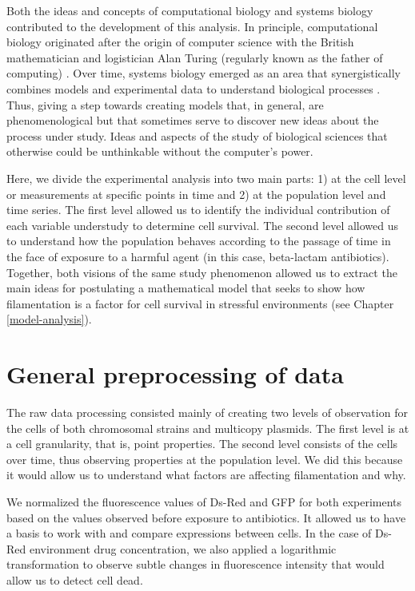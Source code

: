 \documentclass[
  12pt,
  a4paper,
  oneside]{krantz}
\begin{document}
Both the ideas and concepts of computational biology and systems biology
contributed to the development of this analysis. In principle,
computational biology originated after the origin of computer science
with the British mathematician and logistician Alan Turing (regularly
known as the father of computing) \citep{turing1950}. Over time, systems
biology emerged as an area that synergistically combines models and
experimental data to understand biological processes \citep{bruggeman}. Thus,
giving a step towards creating models that, in general, are
phenomenological but that sometimes serve to discover new ideas about
the process under study. Ideas and aspects of the study of biological
sciences that otherwise could be unthinkable without the computer's
power.

Here, we divide the experimental analysis into two main parts: 1) at the
cell level or measurements at specific points in time and 2) at the
population level and time series. The first level allowed us to identify
the individual contribution of each variable understudy to determine
cell survival. The second level allowed us to understand how the
population behaves according to the passage of time in the face of
exposure to a harmful agent (in this case, beta-lactam antibiotics).
Together, both visions of the same study phenomenon allowed us to
extract the main ideas for postulating a mathematical model that seeks
to show how filamentation is a factor for cell survival in stressful
environments (see Chapter \ref{model-analysis}).

\hypertarget{experiment-general-preprocessing}{%
\section{General preprocessing of data}\label{experiment-general-preprocessing}}

The raw data processing consisted mainly of creating two levels of
observation for the cells of both chromosomal strains and multicopy
plasmids. The first level is at a cell granularity, that is, point
properties. The second level consists of the cells over time, thus
observing properties at the population level. We did this because it
would allow us to understand what factors are affecting filamentation
and why.

We normalized the fluorescence values of Ds-Red and GFP for both
experiments based on the values observed before exposure to antibiotics.
It allowed us to have a basis to work with and compare expressions
between cells. In the case of Ds-Red environment drug concentration, we
also applied a logarithmic transformation to observe subtle changes in
fluorescence intensity that would allow us to detect cell dead.
\end{document}
